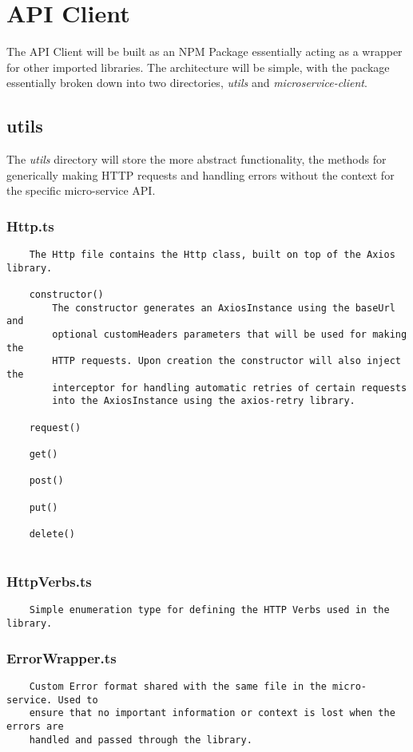 \section{API Client}
The API Client will be built as an NPM Package essentially acting as a wrapper for other imported libraries. The architecture will be simple, with the package essentially broken down into two directories, \emph{utils} and \emph{microservice-client}.
\subsection{utils}
The \emph{utils} directory will store the more abstract functionality, the methods for generically making HTTP requests and handling errors without the context for the specific micro-service API.
\subsubsection{Http.ts}
\begin{verbatim}
    The Http file contains the Http class, built on top of the Axios library. 
    
    constructor()
        The constructor generates an AxiosInstance using the baseUrl and 
        optional customHeaders parameters that will be used for making the 
        HTTP requests. Upon creation the constructor will also inject the 
        interceptor for handling automatic retries of certain requests 
        into the AxiosInstance using the axios-retry library.
        
    request()
    
    get()
    
    post()
    
    put()
    
    delete()
    
\end{verbatim}
\subsubsection{HttpVerbs.ts}
\begin{verbatim}
    Simple enumeration type for defining the HTTP Verbs used in the library.
\end{verbatim}
\subsubsection{ErrorWrapper.ts}
\begin{verbatim}
    Custom Error format shared with the same file in the micro-service. Used to
    ensure that no important information or context is lost when the errors are
    handled and passed through the library.
\end{verbatim}
